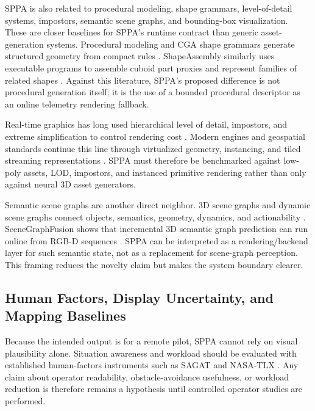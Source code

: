 ﻿\documentclass[11pt,a4paper]{article}
\begin{document}
SPPA is also related to procedural modeling, shape grammars, level-of-detail
systems, impostors, semantic scene graphs, and bounding-box visualization. These
are closer baselines for SPPA's runtime contract than generic asset-generation
systems. Procedural modeling and CGA shape grammars generate structured geometry
from compact rules
\cite{mueller2006procedural}. ShapeAssembly similarly uses executable programs
to assemble cuboid part proxies and represent families of related shapes
\cite{jones2020shapeassembly}. Against this literature, SPPA's proposed
difference is not procedural generation itself; it is the use of a bounded
procedural descriptor as an online telemetry rendering fallback.

Real-time graphics has long used hierarchical level of detail, impostors, and
extreme simplification to control rendering cost
\cite{clark1976hierarchical,decoret2003billboard}. Modern engines and geospatial
standards continue this line through virtualized geometry, instancing, and tiled
streaming representations \cite{epic2024nanite,ogc2023tiles}. SPPA must
therefore be benchmarked against low-poly assets, LOD, impostors, and instanced
primitive rendering rather than only against neural 3D asset generators.

Semantic scene graphs are another direct neighbor. 3D scene graphs and dynamic
scene graphs connect objects, semantics, geometry, dynamics, and actionability
\cite{armeni2019scenegraph,rosinol2020dynamic}. SceneGraphFusion shows that
incremental 3D semantic graph prediction can run online from RGB-D sequences
\cite{wu2021scenegraphfusion}. SPPA can be interpreted as a rendering/backend
layer for such semantic state, not as a replacement for scene-graph perception.
This framing reduces the novelty claim but makes the system boundary clearer.

\subsection{Human Factors, Display Uncertainty, and Mapping Baselines}

Because the intended output is for a remote pilot, SPPA cannot rely on visual
plausibility alone. Situation awareness and workload should be evaluated with
established human-factors instruments such as SAGAT and NASA-TLX
\cite{endsley1988sagat,endsley1995situation,hart1988nasatlx}. Any claim about
operator readability, obstacle-avoidance usefulness, or workload reduction is
therefore remains a hypothesis until controlled operator studies are performed.
\end{document}
